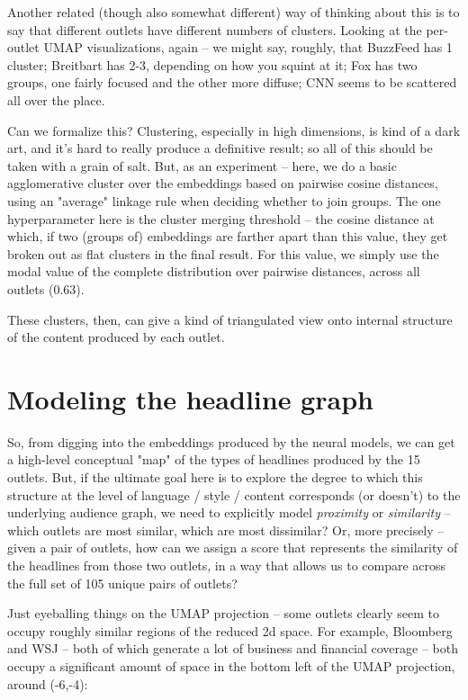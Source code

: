 \documentclass{scrartcl}
\begin{document}
Another related (though also somewhat different) way of thinking about this is to say that different outlets have different numbers of clusters. Looking at the per-outlet UMAP visualizations, again -- we might say, roughly, that BuzzFeed has 1 cluster; Breitbart has 2-3, depending on how you squint at it; Fox has two groups, one fairly focused and the other more diffuse; CNN seems to be scattered all over the place.

Can we formalize this? Clustering, especially in high dimensions, is kind of a dark art, and it's hard to really produce a definitive result; so all of this should be taken with a grain of salt. But, as an experiment -- here, we do a basic agglomerative cluster over the embeddings based on pairwise cosine distances, using an "average" linkage rule when deciding whether to join groups. The one hyperparameter here is the cluster merging threshold -- the cosine distance at which, if two (groups of) embeddings are farther apart than this value, they get broken out as flat clusters in the final result. For this value, we simply use the modal value of the complete distribution over pairwise distances, across all outlets (0.63).


These clusters, then, can give a kind of triangulated view onto internal structure of the content produced by each outlet.


\section{Modeling the headline graph}

So, from digging into the embeddings produced by the neural models, we can get a high-level conceptual "map" of the types of headlines produced by the 15 outlets. But, if the ultimate goal here is to explore the degree to which this structure at the level of language / style / content corresponds (or doesn't) to the underlying audience graph, we need to explicitly model \textit{proximity} or \textit{similarity} -- which outlets are most similar, which are most dissimilar? Or, more precisely -- given a pair of outlets, how can we assign a score that represents the similarity of the headlines from those two outlets, in a way that allows us to compare across the full set of 105 unique pairs of outlets?

Just eyeballing things on the UMAP projection -- some outlets clearly seem to occupy roughly similar regions of the reduced 2d space. For example, Bloomberg and WSJ -- both of which generate a lot of business and financial coverage -- both occupy a significant amount of space in the bottom left of the UMAP projection, around (-6,-4):
\end{document}
